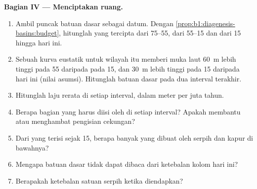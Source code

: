 \begin{problem}
\noindent\textbf{Bagian IV --- Menciptakan ruang.}
\begin{enumerate}[resume]
  \item Ambil puncak batuan dasar sebagai datum. Dengan \cref{prop:b1:diagenesis-basins:budget}, hitunglah  yang tercipta dari \qtyrange{75}{55}{\Ma}, dari \qtyrange{55}{15}{\Ma} dan dari \qty{15}{\Ma} hingga hari ini.
  \item Sebuah kurva eustatik untuk wilayah itu memberi muka laut \qty{60}{m} lebih tinggi pada \qty{55}{\Ma} daripada pada \qty{15}{\Ma}, dan \qty{30}{m} lebih tinggi pada \qty{15}{\Ma} daripada hari ini (nilai asumsi). Hitunglah  batuan dasar pada dua interval terakhir.
  \item Hitunglah laju  rerata di setiap interval, dalam meter per juta tahun.
  \item Berapa bagian  yang harus diisi oleh  di setiap interval? Apakah  membantu atau menghambat pengisian cekungan?
  \item Dari  yang terisi sejak \qty{15}{\Ma}, berapa banyak yang dibuat oleh  serpih dan kapur di bawahnya?
  \item Mengapa  batuan dasar tidak dapat dibaca dari ketebalan kolom hari ini?
  \item Berapakah ketebalan satuan serpih ketika diendapkan?
\end{enumerate}
\end{problem}
